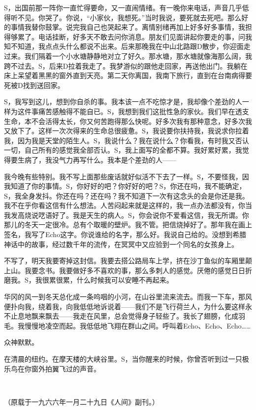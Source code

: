 \par S，出国前那一阵你一直忙得要命，又一直闹情绪。有一晚你来电话，声音几乎低得听不见。你哭了。你说，“小家伙，我想死。”当时我说，要死就去死吧。那么好的事情我替你鼓掌。说完我自己也哭起来了。离情别绪再加上好多好多事情，我担得够累了。电话挂断，好多天不敢去问你消息。朋友们见面讲起你要走的事，问我知不知道，我点点头什么都说不出来。后来那晚我在中山北路跟D散步，你迎面走过来。我们隔着一个小水塘静静地对立了好久。那水塘，那水塘就像海那么阔，我跨不过去。S，后来D拉着我走了。我梦游似的跟他走回家，再送他出门。我躺在床上呆望着黑黑的窗外直到天亮。第二天你离国，我南下旅行，直到在台南病得要死被D找到送回家。
\par S，我写到这儿，想到你自杀的事。我本该一点不吃惊才是，我却像个差劲的人一样为这件事痛苦感触得不能自已。S，我想到我们这批性急的家伙。我们早在透支生命，本不会活得太长，你又何苦跑得那么快呢。好多次我有那种意念，好多次我又放下了。这样一次次得来的生命总很疲惫。S，我说要你扶持我，我说求你拉着我，因为我是天堂的陌生人。S，我说什么？我在说什么？你看我，有时我又否认一切，自己所有的感觉我全部否认。S，我上面写的全都不算。我好累好累，我觉得要生病了，我没气力再写什么。我本是个差劲的人——
\par 我今晚有些特别。我不写上面那些废话就好似活不下去了一样。S，不要怪我，因我知道了你的事情。S，你好好的吧？你好好的吧？S，你还在吗，我不能确定，S，我全身发抖。你还在吗？还在吗？我不知道下一次有这念头的会是你还是我。我不在乎你看这信有什么想法。人苦闷起来就是这样的，我一点办法都没有，你当我发高烧说呓语好了。我是天生的病人。S，你会说你不爱看这信，我无所谓。你那儿的冬天一定很冷。总有个取暖的壁炉。我不管。把信烧掉好了。那年我在画上签名，我写了Echo这字。你说谁给的名字，那么好。我说自己给的。没想到希腊神话中的故事，经过数千年的流传，在冥冥中又应验到一个同名的女孩身上。
\par 不写了，明天我要寄掉这封信。我要去搭公路局车上学，挤在沙丁鱼似的车厢里颠上山。我要念书。我要做好多不喜欢的事，那么多刺人的感觉。厌倦的感觉日日折磨我。S，我很累很累，什么时候我可以安睡不再起来。
\par 华冈的风一到冬天总化成一条呜咽的小河，在山谷里流来流去。而我一下车，那风便扑向我，绕着我，向我低低地诉说着——我们不是飞行荷兰人，为什么要这样永不止息地飘来飘去——我走在风里，总会觉得身子轻些了。我长了翅膀，化成羽毛。我慢慢地凌空而起。我低低地飞翔在群山之间。呼叫着Echo、Echo、Echo……
\par 众神默默。
\par 在清晨的纽约。在摩天楼的大峡谷里。S，当你醒来的时候，你曾否听到过一只极乐鸟在你窗外拍翼飞过的声音。
\par  
\par （原载于一九六六年一月二十九日《人间》副刊。）




